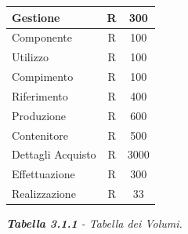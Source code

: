 \documentclass{article}
\begin{document}
\begin{tabular}{p{} c c}
    Gestione & R & 300\\\hline
    Componente & R & 100\\\hline
    Utilizzo & R & 100\\\hline
    Compimento & R &  100\\\hline
    Riferimento & R & 400\\\hline
    Produzione & R & 600\\\hline
    Contenitore & R & 500\\\hline
    Dettagli Acquisto & R & 3000\\\hline
    Effettuazione & R & 300\\\hline
    Realizzazione & R & 33\\\hline
\end{tabular}
\newline
\textit{\textbf{Tabella 3.1.1}  - Tabella dei Volumi.}
\newpage
\end{document}
